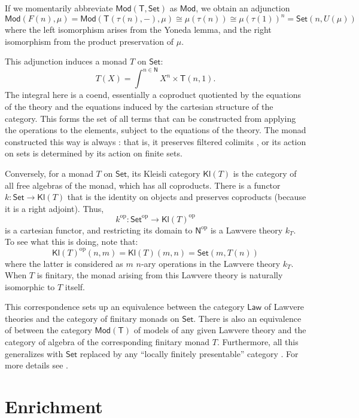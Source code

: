 \documentclass{amsart}
\newcommand{\define}[1]{{\bf \boldmath{#1}}}
\theoremstyle{definition}
\newcommand{\Set}{\mathsf{Set}}
\newcommand{\Law}{\mathsf{Law}}
\newcommand{\Mod}{\mathsf{Mod}}
\newcommand{\NN}{\mathsf{N}}
\newcommand{\T}{\mathsf{T}}
\newcommand{\Kl}{\mathsf{Kl}}
\newcommand{\op}{\mathrm{op}}
\newcommand{\maps}{\colon}
\begin{document}
If we momentarily abbreviate $\Mod(\T,\Set)$ as $\Mod$, we obtain an adjunction
\[   \Mod(F(n),\mu) = \Mod(\T(\tau(n),-),\mu) \cong \mu(\tau(n)) \cong \mu(\tau(1))^n = \Set(n,U(\mu))\] 
where the left isomorphism arises from the Yoneda lemma, and the right isomorphism from the product preservation of $\mu$.   

This adjunction induces a monad $T$ on $\Set$:
\begin{equation}
T(X) = \int^{n\in \NN} X^n \times \T(n,1).
\end{equation}
The integral here is a coend, essentially a coproduct quotiented by the equations of the theory and the equations induced by the cartesian structure of the category. This forms the set of all terms that can be constructed from applying the operations to the elements, subject to the equations of the theory.  The monad constructed this way is always \define{finitary}: that is, it preserves filtered colimits \cite{adamekrosicky}, or its action on sets is determined by its action on finite sets.

Conversely, for a monad $T$ on $\Set$, its Kleisli category $\Kl(T)$ is the category of all free algebras of the monad, which has all coproducts. There is a functor $k\maps \Set \to \Kl(T)$ that is the identity on objects and preserves coproducts (because it is a right adjoint).  Thus,
\[ k^{\op}\maps \Set^{\op} \to \Kl(T)^{\op} \]
is a cartesian functor, and restricting its domain to $\NN^{\op}$ is a Lawvere theory $k_T$. To see what this is doing, note that:
$$\Kl(T)^{\op}(n,m) = \Kl(T)(m,n) = \Set(m,T(n))$$
where the latter is considered as $m$ $n$-ary operations in the Lawvere theory $k_T$.
When $T$ is finitary, the monad arising from this Lawvere theory is naturally isomorphic to $T$ itself.

This correspondence sets up an equivalence between the category $\Law$ of Lawvere theories and the category of finitary monads on $\Set$.  There is also an equivalence of between the category $\Mod(\T)$ of models of any given Lawvere theory and the category of algebra of the corresponding finitary monad $T$.  Furthermore, all this generalizes with $\Set$ replaced by any ``locally finitely presentable'' category \cite{adamekrosicky}. For more details see \cite{barrwells,lawvere,milewski}.

\section{Enrichment}
\label{sec:enrichment}
\end{document}
